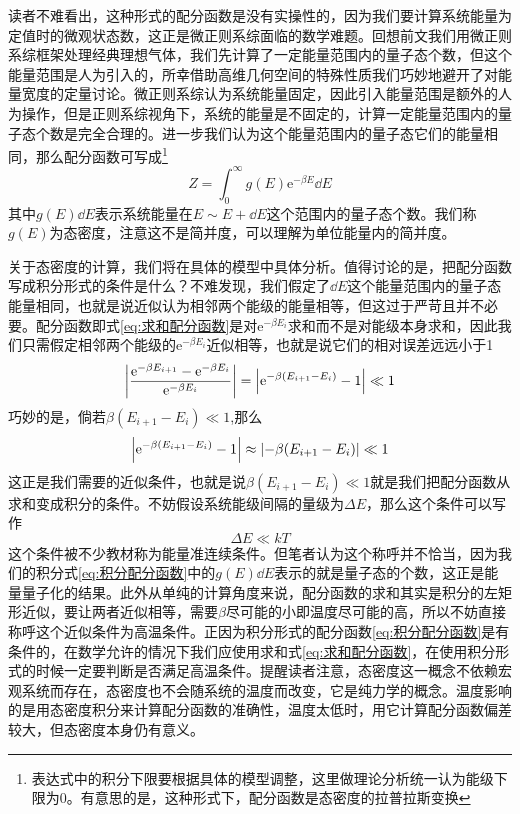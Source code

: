 \documentclass[../../main.tex]{subfiles}
\begin{document}
读者不难看出，这种形式的配分函数是没有实操性的，因为我们要计算系统能量为定值时的微观状态数，这正是微正则系综面临的数学难题。回想前文我们用微正则系综框架处理经典理想气体，我们先计算了一定能量范围内的量子态个数，但这个能量范围是人为引入的，所幸借助高维几何空间的特殊性质我们巧妙地避开了对能量宽度的定量讨论。微正则系综认为系统能量固定，因此引入能量范围是额外的人为操作，但是正则系综视角下，系统的能量是不固定的，计算一定能量范围内的量子态个数是完全合理的。进一步我们认为这个能量范围内的量子态它们的能量相同，那么配分函数可写成\footnote{表达式中的积分下限要根据具体的模型调整，这里做理论分析统一认为能级下限为\(0\)。有意思的是，这种形式下，配分函数是态密度的拉普拉斯变换}
\begin{equation}\label{eq:积分配分函数}
    Z=\int_0^{\infty}g(E)\mathrm{e}^{-\beta E}\dd E
\end{equation}
其中\(g(E)\dd E\)表示系统能量在\(E\sim E+\dd E\)这个范围内的量子态个数。我们称\(g(E)\)为态密度，注意这不是简并度，可以理解为单位能量内的简并度。

关于态密度的计算，我们将在具体的模型中具体分析。值得讨论的是，把配分函数写成积分形式的条件是什么？不难发现，我们假定了\(\dd E\)这个能量范围内的量子态能量相同，也就是说近似认为相邻两个能级的能量相等，但这过于严苛且并不必要。配分函数即式\eqref{eq:求和配分函数}是对\(\mathrm{e}^{-\beta E_i}\)求和而不是对能级本身求和，因此我们只需假定相邻两个能级的\(\mathrm{e}^{-\beta E_i}\)近似相等，也就是说它们的相对误差远远小于1
\begin{equation}
    \abs{\frac{\mathrm{e}^{-\beta E_{i+1}}-\mathrm{e}^{-\beta E_i}}{\mathrm{e}^{-\beta E_i}}}=\abs{\mathrm{e}^{-\beta (E_{i+1}-E_i)}-1}\ll 1
\end{equation}
巧妙的是，倘若\(\beta (E_{i+1}-E_i)\ll 1\),那么
\begin{equation}
    \abs{\mathrm{e}^{-\beta (E_{i+1}-E_i)}-1}\approx \abs{-\beta (E_{i+1}-E_i)}\ll 1
\end{equation}
这正是我们需要的近似条件，也就是说\(\beta (E_{i+1}-E_i)\ll 1\)就是我们把配分函数从求和变成积分的条件。不妨假设系统能级间隔的量级为\(\Delta E\)，那么这个条件可以写作
\begin{equation}
    \Delta E\ll kT
\end{equation}
这个条件被不少教材称为能量准连续条件。但笔者认为这个称呼并不恰当，因为我们的积分式\eqref{eq:积分配分函数}中的\(g(E)\dd E\)表示的就是量子态的个数，这正是能量量子化的结果。此外从单纯的计算角度来说，配分函数的求和其实是积分的左矩形近似，要让两者近似相等，需要\(\beta\)尽可能的小即温度尽可能的高，所以不妨直接称呼这个近似条件为高温条件。正因为积分形式的配分函数\eqref{eq:积分配分函数}是有条件的，在数学允许的情况下我们应使用求和式\eqref{eq:求和配分函数}，在使用积分形式的时候一定要判断是否满足高温条件。提醒读者注意，态密度这一概念不依赖宏观系统而存在，态密度也不会随系统的温度而改变，它是纯力学的概念。温度影响的是用态密度积分来计算配分函数的准确性，温度太低时，用它计算配分函数偏差较大，但态密度本身仍有意义。
\end{document}
